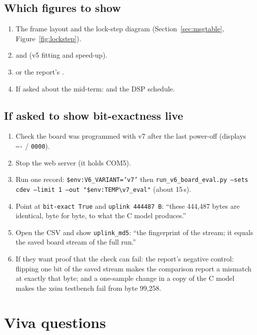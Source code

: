 \documentclass[11pt]{article}
\begin{document}
\subsection{Which figures to show}
\begin{enumerate}
  \item The frame layout and the lock-step diagram (Section~\ref{sec:msgtable}, Figure~\ref{fig:lockstep}).
  \item {} and  (v5 fitting and speed-up).
  \item {} or the report's .
  \item If asked about the mid-term:  and the DSP schedule.
\end{enumerate}

\subsection{If asked to show bit-exactness live}
\begin{enumerate}
  \item Check the board was programmed with v7 after the last power-off (displays \texttt{----} / \texttt{0000}).
  \item Stop the web server (it holds COM5).
  \item Run one record: \texttt{\$env:V6\_VARIANT='v7'} then \texttt{run\_v6\_board\_eval.py --sets cdev --limit 1 --out "\$env:TEMP\textbackslash v7\_eval"} (about 15\,s).
  \item Point at \texttt{bit-exact True} and \texttt{uplink 444487 B}: ``these 444,487 bytes are identical, byte for byte, to what the C model produces.''
  \item Open the CSV and show \texttt{uplink\_md5}: ``the fingerprint of the stream; it equals the saved board stream of the full run.''
  \item If they want proof that the check can fail: the report's negative control: flipping one bit of the saved stream makes the comparison report a mismatch at exactly that byte; and a one-sample change in a copy of the C model makes the xsim testbench fail from byte 99,258.
\end{enumerate}

\section{Viva questions}
\label{sec:viva}
\end{document}
